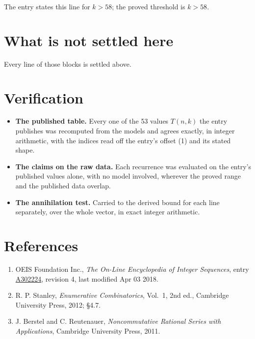 \documentclass[11pt]{article}
\theoremstyle{definition}
\begin{document}
The entry states this line for $k > 58$; the proved threshold is $k > 58$.

\section{What is not settled here}

Every line of those blocks is settled above.

\section{Verification}

\begin{itemize}

\item {\bfseries The published table.} Every one of the 53 values $T(n,k)$ the entry publishes was recomputed from the models and agrees exactly, in integer arithmetic, with the indices read off the entry's offset (1) and its stated shape.

\item {\bfseries The claims on the raw data.} Each recurrence was evaluated on the entry's published values alone, with no model involved, wherever the proved range and the published data overlap.

\item {\bfseries The annihilation test.} Carried to the derived bound for each line separately, over the whole vector, in exact integer arithmetic.

\end{itemize}

\section{References}

\begin{enumerate}

\item OEIS Foundation Inc., \emph{The On-Line Encyclopedia of Integer Sequences}, entry \href{https://oeis.org/A302224}{A302224}, revision 4, last modified Apr 03 2018.

\item R. P. Stanley, \emph{Enumerative Combinatorics}, Vol.~1, 2nd ed., Cambridge University Press, 2012; \S4.7.

\item J. Berstel and C. Reutenauer, \emph{Noncommutative Rational Series with Applications}, Cambridge University Press, 2011.

\end{enumerate}
\end{document}
